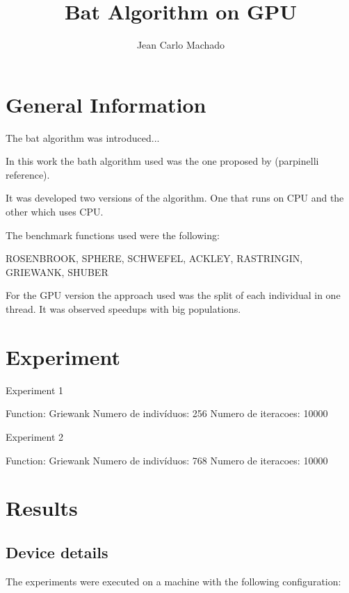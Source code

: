 \documentclass[12pt]{article}
\title{Bat Algorithm on GPU}
\author{Jean Carlo Machado\inst{1}}
\begin{document}
\maketitle

\begin{abstract}
\end{abstract}

\begin{resumo} 
\end{resumo}


\section{General Information}

The bat algorithm was introduced...

In this work the bath algorithm used was the one proposed by (parpinelli reference).

It was developed two versions of the algorithm. One that runs on CPU and the other which uses CPU.



The benchmark functions used were the following:

ROSENBROOK, SPHERE, SCHWEFEL, ACKLEY, RASTRINGIN, GRIEWANK, SHUBER

For the GPU version the approach used was the split of each individual in one thread.
It was observed speedups with big populations.


\section{Experiment}

Experiment 1

Function: Griewank
Numero de indivíduos: 256
Numero de iteracoes: 10000


Experiment 2

Function: Griewank
Numero de indivíduos: 768
Numero de iteracoes: 10000



\section{Results}



\subsection{Device details}

The experiments were executed on a machine with the following configuration:
\end{document}
